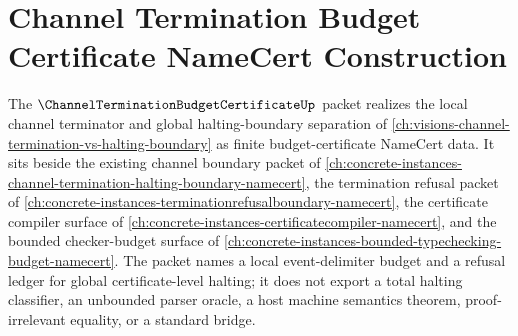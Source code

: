 \chapter{Channel Termination Budget Certificate NameCert Construction}
\label{ch:concrete-instances-channel-termination-budget-certificate-namecert}

The $\ChannelTerminationBudgetCertificateUp$ packet realizes the local channel terminator and global halting-boundary separation of \autoref{ch:visions-channel-termination-vs-halting-boundary} as finite budget-certificate NameCert data. It sits beside the existing channel boundary packet of \autoref{ch:concrete-instances-channel-termination-halting-boundary-namecert}, the termination refusal packet of \autoref{ch:concrete-instances-terminationrefusalboundary-namecert}, the certificate compiler surface of \autoref{ch:concrete-instances-certificatecompiler-namecert}, and the bounded checker-budget surface of \autoref{ch:concrete-instances-bounded-typechecking-budget-namecert}. The packet names a local event-delimiter budget and a refusal ledger for global certificate-level halting; it does not export a total halting classifier, an unbounded parser oracle, a host machine semantics theorem, proof-irrelevant equality, or a standard bridge.

